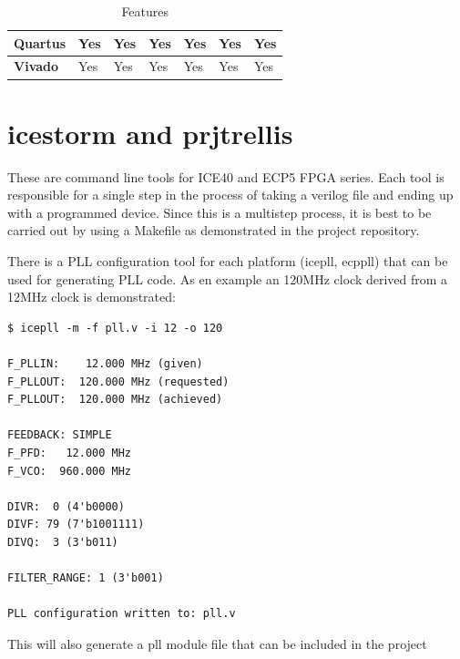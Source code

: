 \begin{table}
\begin{tabular}{|l|l|l|l|l|l|l|}
\textbf{Quartus}    & Yes          & Yes                                                              & Yes                                                                & Yes                 & Yes                                                                 & Yes                                                               \\ \hline
\textbf{Vivado}     & Yes          & Yes                                                              & Yes                                                                & Yes                 & Yes                                                                 & Yes                                                               \\ \hline
\end{tabular}
\caption{Features}
\label{features}
\end{table}

\section{icestorm and prjtrellis}

These are command line tools for ICE40 and ECP5 FPGA series. Each tool is responsible for a single step in the process of taking a verilog file and ending up with a programmed device. Since this is a multistep process, it is best to be carried out by using a Makefile as demonstrated in the project repository.

There is a PLL configuration tool for each platform (icepll, ecppll) that can be used for generating PLL code. As en example an 120MHz clock derived from a 12MHz clock is demonstrated:

\begin{tcolorbox}
\begin{verbatim}
$ icepll -m -f pll.v -i 12 -o 120

F_PLLIN:    12.000 MHz (given)
F_PLLOUT:  120.000 MHz (requested)
F_PLLOUT:  120.000 MHz (achieved)

FEEDBACK: SIMPLE
F_PFD:   12.000 MHz
F_VCO:  960.000 MHz

DIVR:  0 (4'b0000)
DIVF: 79 (7'b1001111)
DIVQ:  3 (3'b011)

FILTER_RANGE: 1 (3'b001)

PLL configuration written to: pll.v

\end{verbatim}
\end{tcolorbox}
This will also generate a pll module file that can be included in the project

